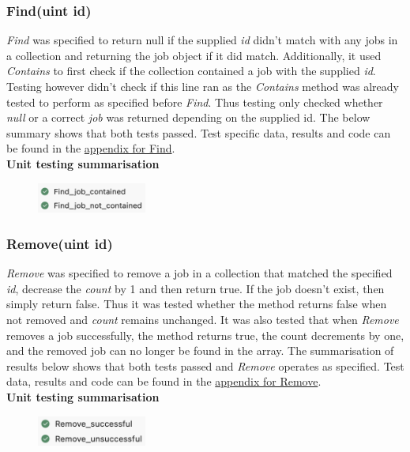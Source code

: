 \documentclass[a4paper]{article}
\begin{document}
\subsubsection{Find(uint id)}
\textit{Find} was specified to return null if the supplied \textit{id} didn't match with any jobs in a collection and returning the job object if it did match. Additionally, it used \textit{Contains} to first check if the collection contained a job with the supplied \textit{id}. Testing however didn't check if this line ran as the \textit{Contains} method was already tested to perform as specified before \textit{Find}. Thus testing only checked whether \textit{null} or a correct \textit{job} was returned depending on the supplied id. The below summary shows that both tests passed. Test specific data, results and code can be found in the \hyperlink{subsubsection.5.2.3}{appendix for Find}.
\\[6pt]
\textbf{Unit testing summarisation}
\begin{figure}[H]
   \includegraphics[height=1cm]{images/Find-summary.png}
\end{figure}

\subsubsection{Remove(uint id)}
\textit{Remove} was specified to remove a job in a collection that matched the specified \textit{id}, decrease the \textit{count} by 1 and then return true. If the job doesn't exist, then simply return false. Thus it was tested whether the method returns false when not removed and \textit{count} remains unchanged. It was also tested that when \textit{Remove} removes a job successfully, the method returns true, the count decrements by one, and the removed job can no longer be found in the array. The summarisation of results below shows that both tests passed and \textit{Remove} operates as specified. Test data, results and code can be found in the \hyperlink{subsubsection.5.2.4}{appendix for Remove}.
\\[6pt]
\textbf{Unit testing summarisation}
\begin{figure}[H]
   \includegraphics[height=1cm]{images/Remove-summary.png}
\end{figure}
\end{document}
